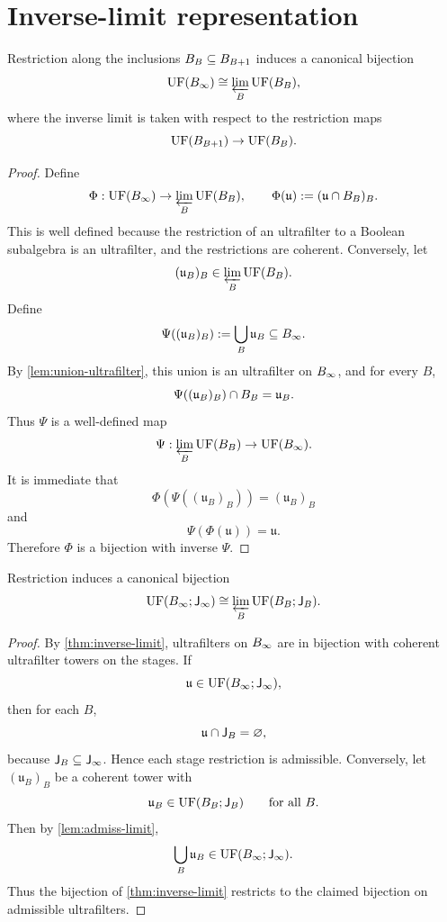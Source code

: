 \section{Inverse-limit representation}
\begin{theorem}
	\label{thm:inverse-limit}
	Restriction along the inclusions \(B_B\subseteq B_{B+1}\) induces a
	canonical bijection
	\[
		\operatorname{UF}(B_\infty)\cong \varprojlim_B \operatorname{UF}(B_B),
	\]
	where the inverse limit is taken with respect to the restriction maps
	\[
		\operatorname{UF}(B_{B+1})\to\operatorname{UF}(B_B).
	\]
\end{theorem}
\begin{proof}
	Define
	\[
		\Phi:\operatorname{UF}(B_\infty)\to \varprojlim_B \operatorname{UF}(B_B),
		\qquad
		\Phi(\mathfrak u):=(\mathfrak u\cap B_B)_B.
	\]
	This is well defined because the restriction of an ultrafilter to a
	Boolean subalgebra is an ultrafilter, and the restrictions are coherent.
	Conversely, let
	\[
		(\mathfrak u_B)_B\in\varprojlim_B \operatorname{UF}(B_B).
	\]
	Define
	\[
		\Psi((\mathfrak u_B)_B):=\bigcup_B\mathfrak u_B\subseteq B_\infty.
	\]
	By \cref{lem:union-ultrafilter}, this union is an ultrafilter on
	\(B_\infty\), and for every \(B\),
	\[
		\Psi((\mathfrak u_B)_B)\cap B_B=\mathfrak u_B.
	\]
	Thus \(\Psi\) is a well-defined map
	\[
		\Psi:\varprojlim_B \operatorname{UF}(B_B)\to \operatorname{UF}(B_\infty).
	\]
	It is immediate that
	\[
		\Phi(\Psi((\mathfrak u_B)_B))=(\mathfrak u_B)_B
	\]
	and
	\[
		\Psi(\Phi(\mathfrak u))=\mathfrak u.
	\]
	Therefore \(\Phi\) is a bijection with inverse \(\Psi\).
\end{proof}
\begin{corollary}
	\label{cor:admiss-inv}
	Restriction induces a canonical bijection
	\[
		\operatorname{UF}(B_\infty;\mathsf J_\infty)
		\cong
		\varprojlim_B \operatorname{UF}(B_B;\mathsf J_B).
	\]
\end{corollary}
\begin{proof}
	By \cref{thm:inverse-limit}, ultrafilters on \(B_\infty\) are in
	bijection with coherent ultrafilter towers on the stages.
	If
	\[
		\mathfrak u\in\operatorname{UF}(B_\infty;\mathsf J_\infty),
	\]
	then for each \(B\),
	\[
		\mathfrak u\cap\mathsf J_B=\varnothing,
	\]
	because \(\mathsf J_B\subseteq\mathsf J_\infty\). Hence each stage restriction is
	admissible.
	Conversely, let \((\mathfrak u_B)_B\) be a coherent tower with
	\[
		\mathfrak u_B\in\operatorname{UF}(B_B;\mathsf J_B)
		\qquad
		\text{for all }B.
	\]
	Then by \cref{lem:admiss-limit},
	\[
		\bigcup_B\mathfrak u_B\in\operatorname{UF}(B_\infty;\mathsf J_\infty).
	\]
	Thus the bijection of \cref{thm:inverse-limit} restricts to the claimed
	bijection on admissible ultrafilters.
\end{proof}

